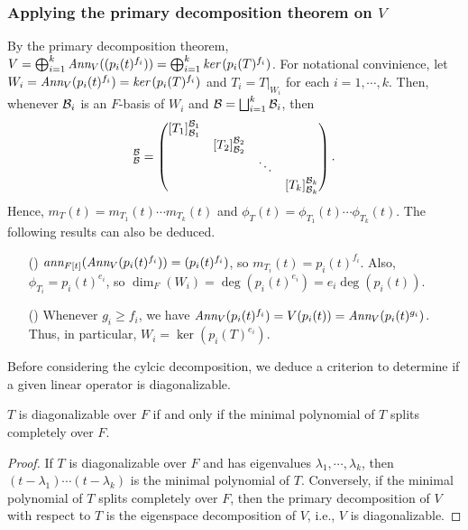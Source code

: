 \subsubsection*{Applying the primary decomposition theorem on $V$}
By the primary decomposition theorem, $V=\bigoplus_{i=1}^k\textit{Ann}_V((p_i(t)^{f_i}))=\bigoplus_{i=1}^k\textit{ker\,}(p_i(T)^{f_i})$.
For notational convinience, let $W_i=\textit{Ann}_V(p_i(t)^{f_i})=\textit{ker\,}(p_i(T)^{f_i})$ and $T_i=T|_{W_i}$ for each $i=1, \cdots, k$.
Then, whenever ${\mathcal{B}}_i$ is an $F$-basis of $W_i$ and ${\mathcal{B}}=\bigsqcup_{i=1}^k{\mathcal{B}}_i$, then
\begin{align*}
    [T]^\mc{B}_\mc{B}=\begin{pmatrix}
        [T_1]^{\mc{B}_1}_{\mc{B}_1}&&&\\
        &[T_2]^{\mc{B}_2}_{\mc{B}_2}&&\\
        &&\ddots&\\
        &&&[T_k]^{\mc{B}_k}_{\mc{B}_k}
    \end{pmatrix}.
\end{align*}
Hence, $m_T(t)=m_{T_1}(t)\cdots m_{T_k}(t)$ and $\phi_T(t)=\phi_{T_1}(t)\cdots\phi_{T_k}(t)$.
The following results can also be deduced.
\begin{enumerate}
    \item[(\romannumeral 1)]
    {
        $\textit{ann}_{F[t]}(\textit{Ann}_V(p_i(t)^{f_i}))=(p_i(t)^{f_i})$, so $m_{T_i}(t)=p_i(t)^{f_i}$.
        Also, $\phi_{T_i}=p_i(t)^{e_i}$, so $\dim_F(W_i)=\deg(p_i(t)^{e_i})=e_i\deg(p_i(t))$.
    }
    \item[(\romannumeral 2)]
    {
        Whenever $g_i\geq f_i$, we have $\textit{Ann}_V(p_i(t)^{f_i})=V(p_i(t))=\textit{Ann}_V(p_i(t)^{g_i})$.
        Thus, in particular, $W_i=\ker(p_i(T)^{e_i})$.
    }
\end{enumerate}
Before considering the cylcic decomposition, we deduce a criterion to determine if a given linear operator is diagonalizable.
\begin{cor}[Diagonalizability]
    $T$ is diagonalizable over $F$ if and only if the minimal polynomial of $T$ splits completely over $F$.
\end{cor}
\begin{proof}
    If $T$ is diagonalizable over $F$ and has eigenvalues $\lambda_1, \cdots, \lambda_k$, then $(t-\lambda_1)\cdots(t-\lambda_k)$ is the minimal polynomial of $T$.
    Conversely, if the minimal polynomial of $T$ splits completely over $F$, then the primary decomposition of $V$ with respect to $T$ is the eigenspace decomposition of $V$, i.e., $V$ is diagonalizable.
\end{proof}

